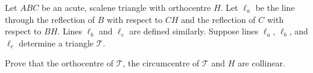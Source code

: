 Let $ABC$ be an acute, scalene triangle with orthocentre $H$. Let $\ell_a$ be the line through the reflection of $B$ with respect to $CH$ and the reflection of $C$ with respect to $BH$. Lines $\ell_b$ and $\ell_c$ are defined similarly. Suppose lines $\ell_a$, $\ell_b$, and $\ell_c$ determine a triangle $\mathcal{T}$.

Prove that the orthocentre of $\mathcal{T}$, the circumcentre of $\mathcal{T}$ and $H$ are collinear.
